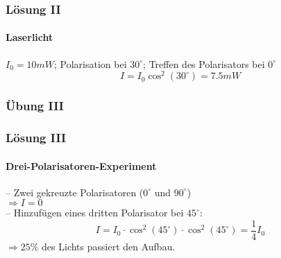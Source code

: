 \begin{frame}
	\frametitle{L{\"o}sung II}
	\framesubtitle{Laserlicht}
	$I_0 = 10 mW$; Polarisation bei $30^\circ$; Treffen des Polarisators bei $0^\circ$
	\[
		I = I_0 \cos^2(30^\circ) = 7.5 mW
	\]
\end{frame}

\begin{frame}
	\frametitle{{\"U}bung III}
\end{frame}

\begin{frame}
	\frametitle{L{\"o}sung III}
	\framesubtitle{Drei-Polarisatoren-Experiment}
	 -- Zwei gekreuzte Polarisatoren ($0^\circ$ und $90^\circ$)\\
	 \hspace{0.5em} $\Rightarrow I = 0$ \\
	 -- Hinzufügen eines dritten Polarisator bei $45^\circ$:\\
	 \[
	 	I = I_0 \cdot \cos^2(45^\circ) \cdot \cos^2(45^\circ) = \frac{1}{4}I_0 
	 \]
	 $\Rightarrow 25\%$ des Lichts passiert den Aufbau.
\end{frame}